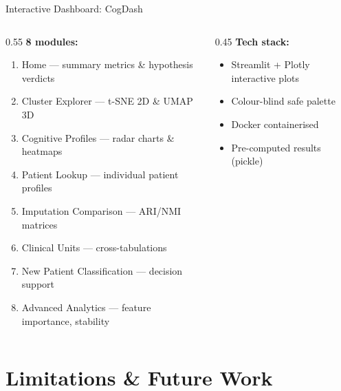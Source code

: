 \documentclass[aspectratio=169, 11pt]{beamer}
\begin{document}
\begin{frame}{Interactive Dashboard: CogDash}
  \begin{columns}[T]
    \begin{column}{0.55\textwidth}
      \textbf{8 modules:}
      \begin{enumerate}
        \item Home --- summary metrics \& hypothesis verdicts
        \item Cluster Explorer --- t-SNE 2D \& UMAP 3D
        \item Cognitive Profiles --- radar charts \& heatmaps
        \item Patient Lookup --- individual patient profiles
        \item Imputation Comparison --- ARI/NMI matrices
        \item Clinical Units --- cross-tabulations
        \item New Patient Classification --- decision support
        \item Advanced Analytics --- feature importance, stability
      \end{enumerate}
    \end{column}
    \begin{column}{0.45\textwidth}
      \textbf{Tech stack:}
      \begin{itemize}
        \item Streamlit + Plotly interactive plots
        \item Colour-blind safe palette
        \item Docker containerised
        \item Pre-computed results (pickle)
      \end{itemize}
    \end{column}
  \end{columns}
\end{frame}

\section{Limitations \& Future Work}
\end{document}
